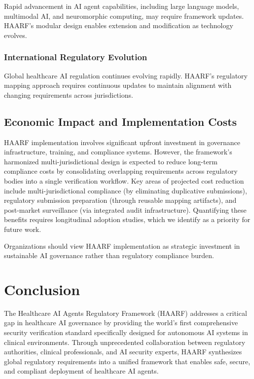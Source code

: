 \documentclass[11pt]{article}
\begin{document}
Rapid advancement in AI agent capabilities, including large language models, multimodal AI, and neuromorphic computing, may require framework updates. HAARF's modular design enables extension and modification as technology evolves.

\subsubsection{International Regulatory Evolution}

Global healthcare AI regulation continues evolving rapidly. HAARF's regulatory mapping approach requires continuous updates to maintain alignment with changing requirements across jurisdictions.

\subsection{Economic Impact and Implementation Costs}

HAARF implementation involves significant upfront investment in governance infrastructure, training, and compliance systems. However, the framework's harmonized multi-jurisdictional design is expected to reduce long-term compliance costs by consolidating overlapping requirements across regulatory bodies into a single verification workflow. Key areas of projected cost reduction include multi-jurisdictional compliance (by eliminating duplicative submissions), regulatory submission preparation (through reusable mapping artifacts), and post-market surveillance (via integrated audit infrastructure). Quantifying these benefits requires longitudinal adoption studies, which we identify as a priority for future work.

Organizations should view HAARF implementation as strategic investment in sustainable AI governance rather than regulatory compliance burden.

\section{Conclusion}

The Healthcare AI Agents Regulatory Framework (HAARF) addresses a critical gap in healthcare AI governance by providing the world's first comprehensive security verification standard specifically designed for autonomous AI systems in clinical environments. Through unprecedented collaboration between regulatory authorities, clinical professionals, and AI security experts, HAARF synthesizes global regulatory requirements into a unified framework that enables safe, secure, and compliant deployment of healthcare AI agents.
\end{document}
